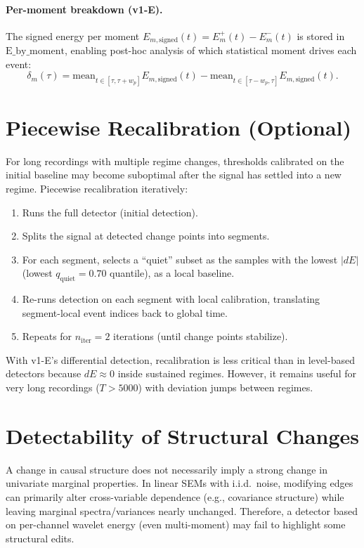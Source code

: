 \documentclass{article}
\begin{document}
\paragraph{Per-moment breakdown (v1-E).}
The signed energy per moment $E_{m,\mathrm{signed}}(t) = E^{+}_m(t) - E^{-}_m(t)$ is stored in
$\mathrm{E\_by\_moment}$, enabling post-hoc analysis of which statistical moment drives each event:
\[
\delta_m(\tau) = \mathrm{mean}_{t\in[\tau, \tau+w_p]}E_{m,\mathrm{signed}}(t)
 - \mathrm{mean}_{t\in[\tau-w_p, \tau]}E_{m,\mathrm{signed}}(t).
\]

\section{Piecewise Recalibration (Optional)}
For long recordings with multiple regime changes, thresholds calibrated on the initial baseline
may become suboptimal after the signal has settled into a new regime. Piecewise recalibration
iteratively:
\begin{enumerate}
  \item Runs the full detector (initial detection).
  \item Splits the signal at detected change points into segments.
  \item For each segment, selects a ``quiet'' subset as the samples with the lowest $|dE|$
        (lowest $q_{\mathrm{quiet}} = 0.70$ quantile), as a local baseline.
  \item Re-runs detection on each segment with local calibration, translating segment-local
        event indices back to global time.
  \item Repeats for $n_{\mathrm{iter}} = 2$ iterations (until change points stabilize).
\end{enumerate}
With v1-E's differential detection, recalibration is less critical than in level-based detectors
because $dE \approx 0$ inside sustained regimes. However, it remains useful for very long
recordings ($T > 5000$) with deviation jumps between regimes.

\section{Detectability of Structural Changes}
A change in causal structure does not necessarily imply a strong change in univariate marginal
properties. In linear SEMs with i.i.d.\ noise, modifying edges can primarily alter cross-variable
dependence (e.g., covariance structure) while leaving marginal spectra/variances nearly unchanged.
Therefore, a detector based on per-channel wavelet energy (even multi-moment) may fail to highlight
some structural edits.
\end{document}

